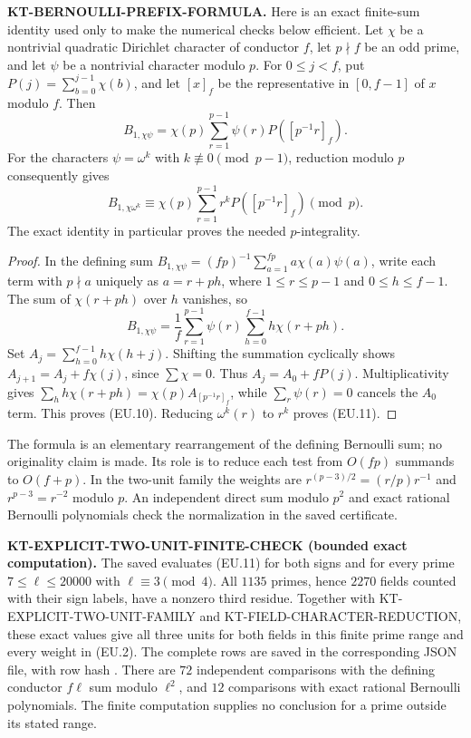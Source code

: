 \documentclass[11pt,a4paper]{article}
\theoremstyle{definition}
\renewcommand{\paragraph}[1]{\par\smallskip\noindent\textbf{#1}\quad\ignorespaces}
\begin{document}
\paragraph{KT-BERNOULLI-PREFIX-FORMULA.}
Here is an exact finite-sum identity used only to make the numerical
checks below efficient.  Let $\chi$ be a nontrivial quadratic Dirichlet
character of conductor $f$, let $p\nmid f$ be an odd prime, and let
$\psi$ be a nontrivial character modulo $p$.  For $0\leq j<f$, put
$P(j)=\sum_{b=0}^{j-1}\chi(b)$, and let $[x]_f$ be the representative
in $[0,f-1]$ of $x$ modulo $f$.  Then
\[
 B_{1,\chi\psi}
   =\chi(p)\sum_{r=1}^{p-1}\psi(r)P([p^{-1}r]_f).          \tag{EU.10}
\]
For the characters $\psi=\omega^k$ with
$k\not\equiv0\pmod{p-1}$, reduction modulo $p$ consequently gives
\[
 B_{1,\chi\omega^k}
 \equiv\chi(p)\sum_{r=1}^{p-1}r^kP([p^{-1}r]_f)\pmod p.  \tag{EU.11}
\]
The exact identity in particular proves the needed $p$-integrality.

\begin{proof}
In the defining sum
$B_{1,\chi\psi}=(fp)^{-1}\sum_{a=1}^{fp}a\chi(a)\psi(a)$,
write each term with $p\nmid a$ uniquely as $a=r+ph$, where
$1\leq r\leq p-1$ and $0\leq h\leq f-1$.  The sum of
$\chi(r+ph)$ over $h$ vanishes, so
\[
 B_{1,\chi\psi}=\frac1f\sum_{r=1}^{p-1}\psi(r)
                       \sum_{h=0}^{f-1}h\chi(r+ph).
\]
Set $A_j=\sum_{h=0}^{f-1}h\chi(h+j)$.  Shifting the summation
cyclically shows $A_{j+1}=A_j+f\chi(j)$, since $\sum\chi=0$.
Thus $A_j=A_0+fP(j)$.  Multiplicativity gives
$\sum_hh\chi(r+ph)=\chi(p)A_{[p^{-1}r]_f}$, while
$\sum_r\psi(r)=0$ cancels the $A_0$ term.  This proves (EU.10).
Reducing $\omega^k(r)$ to $r^k$ proves (EU.11).
\end{proof}

The formula is an elementary rearrangement of the defining Bernoulli
sum; no originality claim is made.  Its role is to reduce each test
from $O(fp)$ summands to $O(f+p)$.  In the two-unit family the weights
are $r^{(p-3)/2}=(r/p)r^{-1}$ and $r^{p-3}=r^{-2}$ modulo $p$.
An independent direct sum modulo $p^2$ and exact rational Bernoulli
polynomials check the normalization in the saved certificate.

\paragraph{KT-EXPLICIT-TWO-UNIT-FINITE-CHECK (bounded exact computation).}
The saved  evaluates
(EU.11) for both signs and for every prime
$7\leq\ell\leq20000$ with $\ell\equiv3\pmod4$.
All $1135$ primes, hence $2270$ fields counted with their sign labels,
have a nonzero third residue.  Together with
KT-EXPLICIT-TWO-UNIT-FAMILY and KT-FIELD-CHARACTER-REDUCTION, these
exact values give all three units for both fields in this finite
prime range and every weight in (EU.2).
The complete rows are saved in the corresponding JSON file, with
row hash
.
There are $72$ independent comparisons with the defining conductor
$f\ell$ sum modulo $\ell^2$, and $12$ comparisons with exact rational
Bernoulli polynomials.  The finite computation supplies no conclusion
for a prime outside its stated range.
\end{document}
